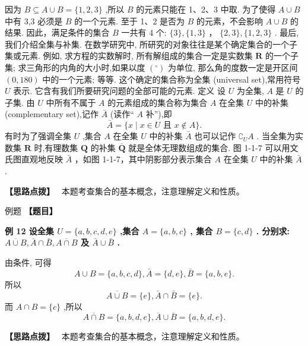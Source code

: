 \documentclass[a4paper,10pt,oneside,fontset=none]{ctexbook}
\newcounter{example}[chapter]
\newenvironment{example}[1][]{\begin{exBox}{例题}{#1}}{\end{exBox}}
\numberwithin{equation}{chapter}
\newenvironment{solution}{\begin{solutionBox}}{\end{solutionBox}}
\newenvironment{hint}{\begin{hintBox}\textbf{【思路点拨】}~}{\end{hintBox}}
\begin{document}
\begin{solution}
因为 $B \subseteq  A \cup  B = \{ 1,2,3\}$ ,所以 $B$ 的元素只能在 1、2、3 中取. 为了使得 $A \cup  B$ 中有 3,3 必须是 $B$ 的一个元素. 至于 1、2 是否为 $B$ 的元素，不会影响 $A \cup  B$ 的结果.
因此，满足条件的集合 $B$ 一共有 4 个: $\{ 3\} ,\{ 1,3\}$ ， $\{ 2,3\} ,\{ 1,2,3\}$ .
最后, 我们介绍全集与补集.
在数学研究中, 所研究的对象往往是某个确定集合的一个子集或元素. 例如, 求方程的实数解时, 所有解组成的集合一定是实数集 $\mathbf{R}$ 的一个子集; 求三角形的内角的大小时,如果以度 $\left( {}^{ \circ  }\right)$ 为单位, 那么角的度数一定是开区间 $\left( {0,{180}}\right)$ 中的一个元素; 等等. 这个确定的集合称为全集 (universal set),常用符号 $U$ 表示. 它含有我们所要研究问题的全部可能的元素.
定义 设 $U$ 为全集, $A$ 是 $U$ 的子集. 由 $U$ 中所有不属于 $A$ 的元素组成的集合称为集合 $A$ 在全集 $U$ 中的补集 (complementary set),记作 $\bar{A}$ (读作“ $A$ 补”),即
$$
\bar{A} = \{ x \mid  x \in  U\text{ 且 }x \notin  A\} .
$$
有时为了强调全集 $U$ ,集合 $A$ 在全集 $U$ 中的补集 $\bar{A}$ 也可以记作 ${\complement }_{U}A$ .
当全集为实数集 $\mathbf{R}$ 时,有理数集 $\mathbf{Q}$ 的补集 $\overline{\mathbf{Q}}$ 就是全体无理数组成的集合.
图 1-1-7
可以用文氏图直观地反映 $\bar{A}$ ，如图 1-1-7，其中阴影部分表示集合 $A$ 在全集 $U$ 中的补集 $\bar{A}$ .
\end{solution}

\begin{hint}
本题考查集合的基本概念，注意理解定义和性质。
\end{hint}

\begin{example}
\textbf{【题目】}\par\vspace{0.3em}
\textbf{例 12 设全集 $U = \{ a, b, c, d, e\}$ ,集合 $A = \{ a, b, c\}$ , 集合 $B = \{ c, d\}$ . 分别求: $\overline{A \cup  B},\bar{A} \cap  \bar{B},\overline{A \cap  B}$ 及 $\bar{A} \cup  \bar{B}$ .}\par\vspace{0.3em}
\end{example}

\begin{solution}
由条件, 可得
$$
A \cup  B = \{ a, b, c, d\} ,\bar{A} = \{ d, e\} ,\bar{B} = \{ a, b, e\} .
$$
所以
$$
\overline{A \cup  B} = \{ e\} ,\bar{A} \cap  \bar{B} = \{ e\} .
$$
而 $A \cap  B = \{ c\}$ ,所以
$$
\overline{A \cap  B} = \{ a, b, d, e\} ,\overline{A} \cup  \overline{B} = \{ a, b, d, e\} .
$$
\end{solution}

\begin{hint}
本题考查集合的基本概念，注意理解定义和性质。
\end{hint}
\end{document}
